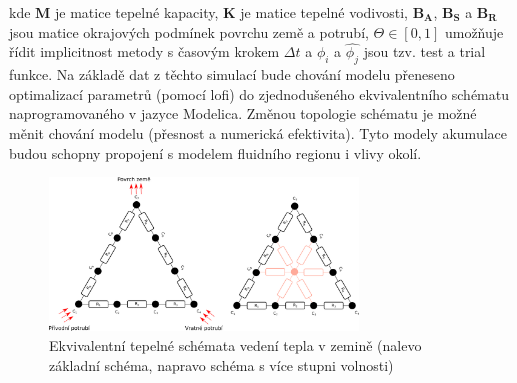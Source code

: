 kde \(\boldsymbol{M}\) je matice tepelné kapacity, \(\boldsymbol{K}\) je matice
tepelné vodivosti, \(\boldsymbol{B_A}\), \(\boldsymbol{B_S}\) a
\(\boldsymbol{B_R}\) jsou matice okrajových podmínek povrchu
země a potrubí, \(\Theta \in \left[0,1\right]\) umožňuje řídit implicitnost
metody s časovým krokem \(\Delta{t}\) a \(\phi_i\) a \(\hat{\phi_j}\)
jsou tzv. test a trial funkce. Na základě dat z těchto simulací bude chování
modelu přeneseno optimalizací parametrů (pomocí \acrshort{lofi}) do
zjednodušeného ekvivalentního schématu naprogramovaného v jazyce Modelica.
Změnou topologie schématu je možné měnit chování modelu (přesnost a numerická
efektivita). Tyto modely akumulace budou schopny propojení s modelem fluidního
regionu i vlivy okolí.

\begin{figure}[h!]
  \centering
    \includegraphics[width=0.73\textwidth]{figures/acumulation_burried}
    \caption{Ekvivalentní tepelné schémata vedení tepla v zemině (nalevo
      základní schéma, napravo schéma s více stupni volnosti)}
    \label{fig:equivalent_scheme}
\end{figure}
